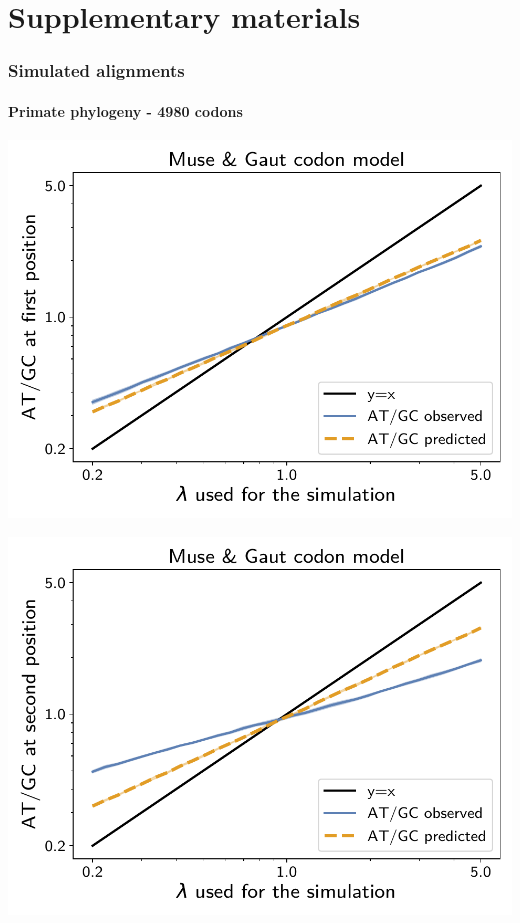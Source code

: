 \documentclass{article}
\begin{document}
\part*{Supplementary materials}
\tableofcontents

\section{Simulated alignments}
\label{sec:simulated-alignments}

\subsection{Primate phylogeny - 4980 codons}

\begin{center}
    \begin{minipage}{0.325\linewidth}
        \includegraphics[width=\linewidth, page=1]{inference_simulations/obs_atgc_1_MG.pdf}
    \end{minipage}
    \hfill
    \begin{minipage}{0.325\linewidth}
        \includegraphics[width=\linewidth, page=1]{inference_simulations/obs_atgc_2_MG.pdf}

\end{minipage}
\end{center}
\end{document}
